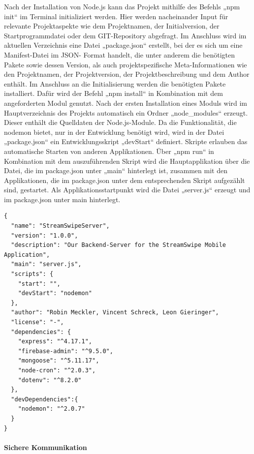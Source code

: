 Nach der Installation von Node.js kann das Projekt mithilfe des Befehls „npm init“ im Terminal initializiert werden. 
Hier werden nacheinander Input für relevante Projektaspekte wie dem Projektnamen, der Initialversion, der Startprogrammdatei oder dem GIT-Repository abgefragt.  
Im Anschluss wird im aktuellen Verzeichnis eine Datei „package.json“ erstellt,  bei der es sich um eine Manifest-Datei im JSON- Format handelt, die unter anderem die benötigten Pakete sowie dessen Version, als auch projektspezifische Meta-Informationen wie den Projektnamen, der Projektversion, der Projektbeschreibung und dem Author enthält.
\newline
Im Anschluss an die Initialisierung werden die benötigten Pakete installiert. Dafür wird der Befehl „npm install“ in Kombination mit dem angeforderten Modul genutzt. 
Nach der ersten Installation eines Moduls wird im Hauptverzeichnis des Projekts automatisch ein Ordner „node\_modules“ erzeugt. Dieser enthält die Quelldaten der Node.js-Module. 
\newline
Da die Funktionalität, die nodemon bietet, nur in der Entwicklung benötigt wird, wird in der Datei „package.json“ ein Entwicklungsskript „devStart“ definiert. 
Skripte erlauben das automatische Starten von anderen Applikationen. Über „npm run“ in Kombination mit dem auszuführenden Skript wird die Hauptapplikation über die Datei, die im package.json unter „main“ hinterlegt ist, zusammen mit den Applikationen, die im package.json unter dem entsprechenden Skript aufgezählt sind, gestartet.
\newline
Als Applikationsstartpunkt wird die Datei „server.js“ erzeugt und im package.json unter main hinterlegt. 

\begin{lstlisting}[caption=Datei package.json, label=lst:packagejson]
 {
  "name": "StreamSwipeServer",
  "version": "1.0.0",
  "description": "Our Backend-Server for the StreamSwipe Mobile Application",
  "main": "server.js",
  "scripts": {
    "start": "",
    "devStart": "nodemon"
  },
  "author": "Robin Meckler, Vincent Schreck, Leon Gieringer",
  "license": "-",
  "dependencies": {
    "express": "^4.17.1",
    "firebase-admin": "^9.5.0",
    "mongoose": "^5.11.17",
    "node-cron": "^2.0.3",
    "dotenv": "^8.2.0"
  },
  "devDependencies":{
    "nodemon": "^2.0.7"
  }
}
\end{lstlisting}

\paragraph{Sichere Kommunikation}

